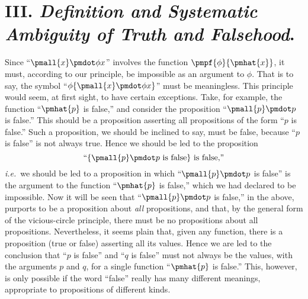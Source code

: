 \documentclass[letterpaper,12pt,openany,leqno]{book}
\begin{document}
\section*{\centering III. \textit{Definition and Systematic Ambiguity of Truth and Falsehood}.}

Since ``$\pmall{x} \pmdot \phi x$'' involves the function $\pmpf{\phi}{\pmhat{x}}$, it must, according to our principle, be impossible as an argument to $\phi$. That is to say, the symbol ``$\phi\{\pmall{x} \pmdot \phi x\}$'' must be meaningless. This principle would seem, at first sight, to have certain exceptions. Take, for example, the function ``$\pmhat{p}$ is false,'' and consider the proposition ``$\pmall{p}\pmdot p$ is false.'' This should be a proposition asserting all propositions of the form ``$p$ is false.'' Such a proposition, we should be inclined to say, must be false, because ``$p$ is false'' is not always true. Hence we should be led to the proposition
\[
	\text{``}\{\pmall{p}\pmdot p \text{ is false}\}\text{ is false,''}
\]
\textit{i.e.}\ we should be led to a proposition in which ``$\pmall{p}\pmdot p$ is false'' is the argument to the function ``$\pmhat{p}$ is false,'' which we had declared to be impossible. Now it will be seen that ``$\pmall{p}\pmdot p$ is false,'' in the above, purports to be a proposition about \textit{all} propositions, and that, by the general form of the vicious-circle principle, there must be no propositions about all propositions. Nevertheless, it seems plain that, given any function, there is a proposition (true or false) asserting all its values. Hence we are led to the conclusion that ``$p$ is false'' and ``$q$ is false'' must not always be the values, with the arguments $p$ and $q$, for a single function ``$\pmhat{p}$ is false.'' This, however, is only possible if the word ``false'' really has many different meanings, appropriate to propositions of different kinds.
\end{document}

